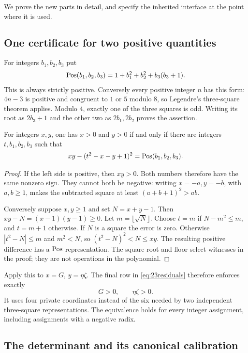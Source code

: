 We prove the new parts in detail, and specify the inherited interface at
the point where it is used.

\subsection{One certificate for two positive quantities}

For integers $b_1,b_2,b_3$ put
\[
 \operatorname{Pos}(b_1,b_2,b_3)=1+b_1^2+b_2^2+b_3(b_3+1).
\]
This is always strictly positive. Conversely every positive integer $n$
has this form: $4n-3$ is positive and congruent to $1$ or $5$ modulo $8$,
so Legendre's three-square theorem applies. Modulo $4$, exactly one of
the three squares is odd. Writing its root as $2b_3+1$ and the other two
as $2b_1,2b_2$ proves the assertion.

\begin{lemma}
\label{lem:shared}
For integers $x,y$, one has $x>0$ and $y>0$ if and only if there are
integers $t,b_1,b_2,b_3$ such that
\begin{equation}
 xy-(t^2-x-y+1)^2=\operatorname{Pos}(b_1,b_2,b_3).
 \label{eq:pair}
\end{equation}
\end{lemma}
\begin{proof}
If the left side is positive, then $xy>0$. Both numbers therefore have
the same nonzero sign. They cannot both be negative: writing
$x=-a,y=-b$, with $a,b\ge1$, makes the subtracted square at least
$(a+b+1)^2>ab$.

Conversely suppose $x,y\ge1$ and set $N=x+y-1$. Then
$xy-N=(x-1)(y-1)\ge0$. Let $m=\lfloor\sqrt N\rfloor$. Choose $t=m$
if $N-m^2\le m$, and $t=m+1$ otherwise. If $N$ is a square the error
is zero. Otherwise $|t^2-N|\le m$ and $m^2<N$, so
$(t^2-N)^2<N\le xy$. The resulting positive difference has a
$\operatorname{Pos}$ representation. The square root and floor select witnesses in
the proof; they are not operations in the polynomial.
\end{proof}

Apply this to $x=G$, $y=\eta\zeta$. The final row in
\eqref{eq:23residuals} therefore enforces exactly
\[
 G>0,\qquad\eta\zeta>0.
\]
It uses four private coordinates instead of the six needed by two
independent three-square representations. The equivalence holds for every
integer assignment, including assignments with a negative radix.

\subsection{The determinant and its canonical calibration}

